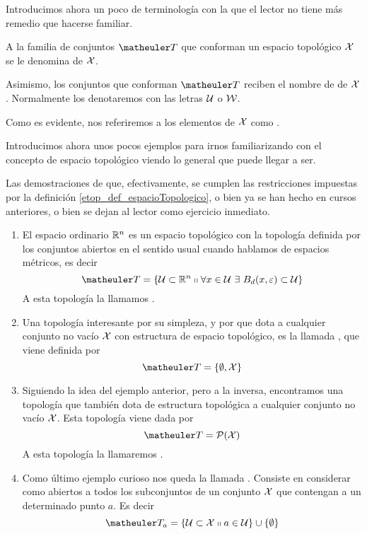 Introducimos ahora un poco de terminología con la que el lector no tiene más remedio que hacerse familiar.
\begin{obs}[Terminología]
	\label{etop_obs_terminologia}
	A la familia de conjuntos $\T$ que conforman un espacio topológico $\mathcal{X}$ se le denomina  de $\mathcal{X}$.
	
	Asimismo, los conjuntos que conforman $\T$ reciben el nombre de  de $\mathcal{X}$. Normalmente los denotaremos con las letras $\mathcal{U}$ o $\mathcal{W}$.
	
	Como es evidente, nos referiremos a los elementos de $\mathcal{X}$ como .
\end{obs}
Introducimos ahora unos pocos ejemplos para irnos familiarizando con el concepto de espacio topológico viendo lo general que puede llegar a ser.
\begin{exa}[Topologías]
	\label{etop_exa_topologias}
	Las demostraciones de que, efectivamente, se cumplen las restricciones impuestas por la definición \ref{etop_def_espacioTopologico}, o bien ya se han hecho en cursos anteriores, o bien se dejan al lector como ejercicio inmediato.
	\begin{enumerate}
		\item El espacio ordinario $\mathbb{R}^n$ es un espacio topológico con la topología definida por los conjuntos abiertos en el sentido usual cuando hablamos de espacios métricos, es decir
		\begin{equation}
		\label{etop_eq_topologiaRn}
		\T = \{\U\subset\R^n\tq \forall x\in\U\ \exists\  B_{d}(x,\varepsilon)\subset\U\}
		\end{equation}
		A esta topología la llamamos .
		\item Una topología interesante por su simpleza, y por que dota a cualquier conjunto no vacío $\mathcal{X}$ con estructura de espacio topológico, es la llamada , que viene definida por \begin{equation}
		\label{etop_eq_topologiaTrivial}
		\T=\{\emptyset, \X\}
		\end{equation}
		\item Siguiendo la idea del ejemplo anterior, pero a la inversa, encontramos una topología que también dota de estructura topológica a cualquier conjunto no vacío $\mathcal{X}$. Esta topología viene dada por
		\begin{equation}
		\label{etop_eq_topologiaDiscreta}
		\T = \partes(\X)
		\end{equation}
		A esta topología la llamaremos .
		\item Como último ejemplo curioso nos queda la llamada . Consiste en considerar como abiertos a todos los subconjuntos de un conjunto $\mathcal{X}$ que contengan a un determinado punto $a$. Es decir
		\begin{equation}
		\label{etop_eq_topologiaPunto}
		\T_a = \{\U \subset \X\tq a\in\U\}\cup\{\emptyset\}
		\end{equation}
		

\end{enumerate}
\end{exa}
